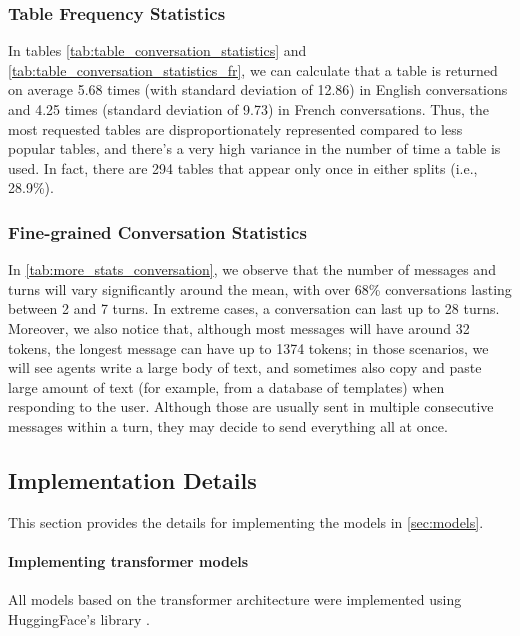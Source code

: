 \documentclass[11pt]{article}
\begin{document}
\subsubsection{Table Frequency Statistics}

In tables \ref{tab:table_conversation_statistics} and \ref{tab:table_conversation_statistics_fr}, we can calculate that a table is returned on average 5.68 times (with standard deviation of 12.86) in English conversations and 4.25 times (standard deviation of 9.73) in French conversations. Thus, the most requested tables are disproportionately represented compared to less popular tables, and there's a very high variance in the number of time a table is used. In fact, there are 294 tables that appear only once in either splits (i.e., 28.9\%).

\subsubsection{Fine-grained Conversation Statistics}

In \autoref{tab:more_stats_conversation}, we observe that the number of messages and turns will vary significantly around the mean, with over 68\% conversations lasting between 2 and 7 turns. In extreme cases, a conversation can last up to 28 turns. Moreover, we also notice that, although most messages will have around 32 tokens, the longest message can have up to 1374 tokens; in those scenarios, we will see agents write a large body of text, and sometimes also copy and paste large amount of text (for example, from a database of templates) when responding to the user. Although those are usually sent in multiple consecutive messages within a turn, they may decide to send everything all at once.


\subsection{Implementation Details}
\label{sec:appendix_implementation_details}

This section provides the details for implementing the models in \autoref{sec:models}.

\paragraph{Implementing transformer models} All models based on the transformer architecture \citep{vaswani_attention_2017} were implemented using HuggingFace's library \citep{wolf_transformers_2020}. 
\end{document}
